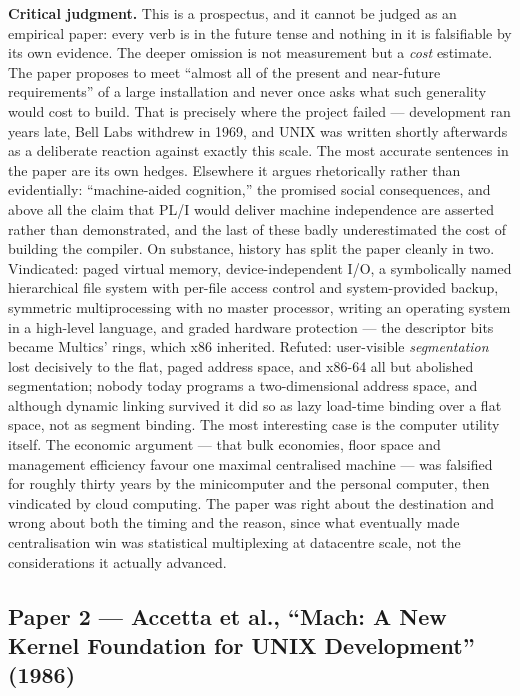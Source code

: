 \textbf{Critical judgment.} This is a prospectus, and it cannot be judged as an empirical
paper: every verb is in the future tense and nothing in it is falsifiable by its own
evidence. The deeper omission is not measurement but a \emph{cost} estimate. The paper
proposes to meet ``almost all of the present and near-future requirements'' of a large
installation and never once asks what such generality would cost to build. That is precisely
where the project failed --- development ran years late, Bell Labs withdrew in 1969, and
UNIX was written shortly afterwards as a deliberate reaction against exactly this scale.
The most accurate sentences in the paper are its own hedges. Elsewhere it argues
rhetorically rather than evidentially: ``machine-aided cognition,'' the promised social
consequences, and above all the claim that PL/I would deliver machine independence are
asserted rather than demonstrated, and the last of these badly underestimated the cost of
building the compiler. On substance, history has split the paper cleanly in two. Vindicated:
paged virtual memory, device-independent I/O, a symbolically named hierarchical file system
with per-file access control and system-provided backup, symmetric multiprocessing with no
master processor, writing an operating system in a high-level language, and graded hardware
protection --- the descriptor bits became Multics' rings, which x86 inherited. Refuted:
user-visible \emph{segmentation} lost decisively to the flat, paged address space, and
x86-64 all but abolished segmentation; nobody today programs a two-dimensional address
space, and although dynamic linking survived it did so as lazy load-time binding over a flat
space, not as segment binding. The most interesting case is the computer utility itself.
The economic argument --- that bulk economies, floor space and management efficiency favour
one maximal centralised machine --- was falsified for roughly thirty years by the
minicomputer and the personal computer, then vindicated by cloud computing. The paper was
right about the destination and wrong about both the timing and the reason, since what
eventually made centralisation win was statistical multiplexing at datacentre scale, not the
considerations it actually advanced.

\subsection*{Paper 2 --- Accetta et al., ``Mach: A New Kernel Foundation for UNIX Development'' (1986)}
\label{p4:sec:mach}

